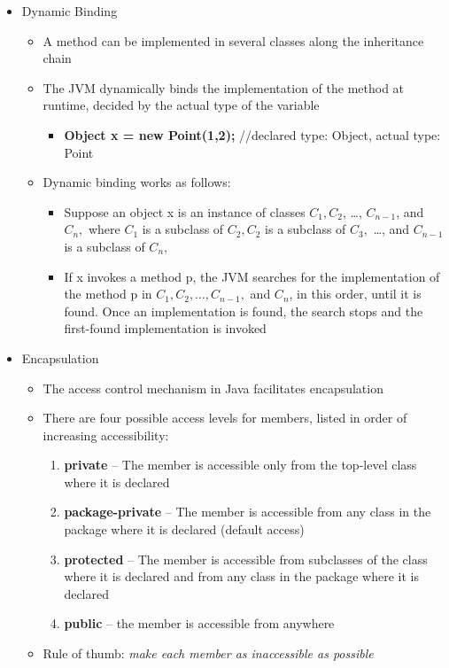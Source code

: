 \documentclass[11pt]{article}
\begin{document}
\begin{itemize}
	\item Dynamic Binding
		\begin{itemize}
			\item A method can be implemented in several classes along the inheritance chain
			\item The JVM dynamically binds the implementation of the method at runtime, decided by the actual type of the variable
				\begin{itemize}
					\item \textbf{Object x = new Point(1,2);} \hspace{1cm}	//declared type: Object, actual type: Point
				\end{itemize}
			\item Dynamic binding works as follows:
				\begin{itemize}
					\item Suppose an object x is an instance of classes $ C_1, C_2 $, \ldots , $ C_{n-1} $, and $ C_n, $ where $ C_1 $ is a subclass of $ C_2, C_2 $ is a subclass of $ C_3, $ \ldots , and $ C_{n-1} $ is a subclass of $ C_n, $
					\item If x invokes a method p, the JVM searches for the implementation of the method p in $ C_1, C_2, \ldots , C_{n-1}, $ and $ C_n $, in this order, until it is found. Once an implementation is found, the search stops and the first-found implementation is invoked
				\end{itemize}
		\end{itemize}

	\item Encapsulation
		\begin{itemize}
			\item The access control mechanism in Java facilitates encapsulation
			\item There are four possible access levels for members, listed in order of
			increasing accessibility:
				\begin{enumerate}
					\item \textbf{private} -- The member is accessible only from the top-level class where it is declared
					\item \textbf{package-private} -- The member is accessible from any class in the package where it is declared (default access)
					\item \textbf{protected} -- The member is accessible from subclasses of the class where it is declared and from any class in the package where it is declared
					\item \textbf{public} --  the member is accessible from anywhere
				\end{enumerate}
			\item Rule of thumb: \textit{make each member as inaccessible as possible}
		\end{itemize}
\end{itemize}
\end{document}
